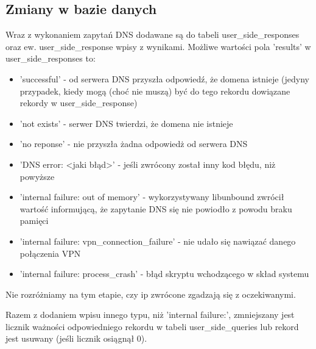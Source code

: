 \documentclass{hitec}
\begin{document}
\begin{sloppypar}
\subsection{Zmiany w bazie danych}
Wraz z wykonaniem zapytań DNS dodawane są do tabeli
user\_side\_responses oraz ew. user\_side\_response
wpisy z wynikami. Możliwe wartości pola 'results'
w user\_side\_responses to:
\begin{itemize}
  \item 'successful' - od serwera DNS przyszła odpowiedź, że domena istnieje
    (jedyny przypadek, kiedy mogą (choć nie muszą) być do tego rekordu dowiązane
    rekordy w user\_side\_response)
  \item 'not exists' - serwer DNS twierdzi, że domena nie istnieje
  \item 'no reponse' - nie przyszła żadna odpowiedż od serwera DNS
  \item 'DNS error: \textless jaki błąd\textgreater ' - jeśli zwrócony został
    inny kod błędu, niż powyższe
  \item 'internal failure: out of memory' - wykorzystywany libunbound zwrócił
    wartość informującą, że zapytanie DNS się nie powiodło z powodu braku
    pamięci
  \item 'internal failure: vpn\_connection\_failure' - nie udało się
    nawiązać danego połączenia VPN
  \item 'internal failure: process\_crash' - błąd skryptu
    wchodzącego w skład systemu
\end{itemize}

Nie rozróżniamy na tym etapie, czy ip zwrócone zgadzają się z oczekiwanymi.

Razem z dodaniem wpisu innego typu, niż 'internal failure:', zmniejszany
jest licznik ważności odpowiedniego rekordu w tabeli
user\_side\_queries lub rekord jest usuwany
(jeśli licznik osiągnął 0).

\end{sloppypar}
\end{document}
